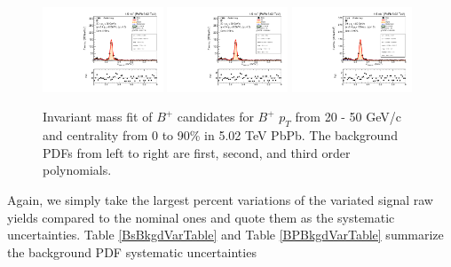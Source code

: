 \begin{figure}[hbtp]
\begin{center}
\includegraphics[width=0.32\textwidth]{Figures/Chapter4/data_PbPb_1_Bpt_2050_1st_doubly0_ntKp.pdf}
\includegraphics[width=0.32\textwidth]{Figures/Chapter4/data_PbPb_1_Bpt_2050_2nd_doubly0_ntKp.pdf}
\includegraphics[width=0.32\textwidth]{Figures/Chapter4/data_PbPb_1_Bpt_2050_3rd_doubly0_ntKp.pdf}
\caption{Invariant mass fit of $B^+$ candidates for $B^+$ $p_T$ from 20 - 50 GeV/c and centrality from 0 to 90\% in 5.02 TeV PbPb. The background PDFs from left to right are first, second, and third order polynomials.}
\label{BPBkgdVar}
\end{center}
\end{figure}

Again, we simply take the largest percent variations of the variated signal raw yields compared to the nominal ones and quote them as the systematic uncertainties. Table \ref{BsBkgdVarTable} and Table \ref{BPBkgdVarTable} summarize the background PDF systematic uncertainties 

